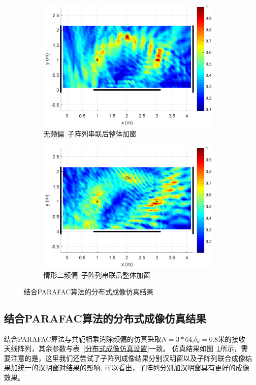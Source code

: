 \begin{figure}[htb]
\begin{subfigure}[t]{.45\linewidth}
    \includegraphics[width=\textwidth]{figures/distribution/TPF/3.eps}
    \caption{无频偏~子阵列串联后整体加窗}
  \end{subfigure}
  \begin{subfigure}[t]{.45\linewidth}
    \centering
    \includegraphics[width=\textwidth]{figures/distribution/TPF/4.eps}
    \caption{情形二频偏~子阵列串联后整体加窗}
  \end{subfigure}
  \caption{结合PARAFAC算法的分布式成像仿真结果}
  \label{TPF分布式}
\end{figure}

\subsection{结合PARAFAC算法的分布式成像仿真结果}
结合PARAFAC算法与共轭相乘消除频偏的仿真采取$N=3*64$,$\delta_d=0.8$米的接收天线阵列，其余参数与表~\ref{分布式成像仿真设置}一致。
仿真结果如图~\ref{TPF分布式}所示，需要注意的是，这里我们还尝试了子阵列成像结果分别汉明窗以及子阵列联合成像结果加统一的汉明窗对结果的影响,
可以看出，子阵列分别加汉明窗具有更好的成像效果。